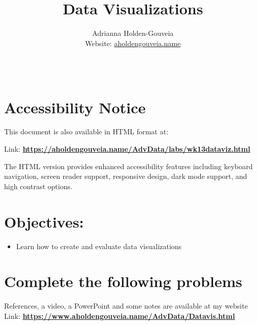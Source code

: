 \documentclass[12pt]{article}
\title{Data Visualizations}
\author{
        Adrianna Holden-Gouveia \\
        Website: \href{https://aholdengouveia.name}{aholdengouveia.name}\\ 
        \date{\vspace{-5ex}}
        \faGithub {: aholdengouveia} \\
        }
\begin{document}
    

\maketitle



\section*{Accessibility Notice}
This document is also available in HTML format at:

Link: \href{https://aholdengouveia.name/AdvData/labs/wk13dataviz.html}{\textbf{https://aholdengouveia.name/AdvData/labs/wk13dataviz.html}}

The HTML version provides enhanced accessibility features including keyboard navigation, screen reader support, responsive design, dark mode support, and high contrast options.

\section*{Objectives:}
\begin{itemize}
    \item Learn how to create and evaluate data visualizations
\end{itemize}
\section*{Complete the following problems}

References, a video, a PowerPoint and some notes are available at my website
Link: \href{https://www.aholdengouveia.name/AdvData/Datavis.html}{\textbf{https://www.aholdengouveia.name/AdvData/Datavis.html}}
\end{document}

